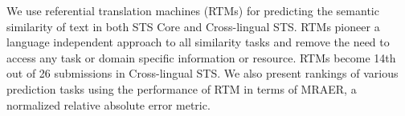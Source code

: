 We use referential translation machines (RTMs) for predicting the semantic similarity of text in both STS Core and Cross-lingual STS. RTMs pioneer a language independent approach to all similarity tasks and remove the need to access any task or domain specific information or resource. RTMs become 14th out of 26 submissions in Cross-lingual STS. We also present rankings of various prediction tasks using the performance of RTM in terms of MRAER, a normalized relative absolute error metric.
